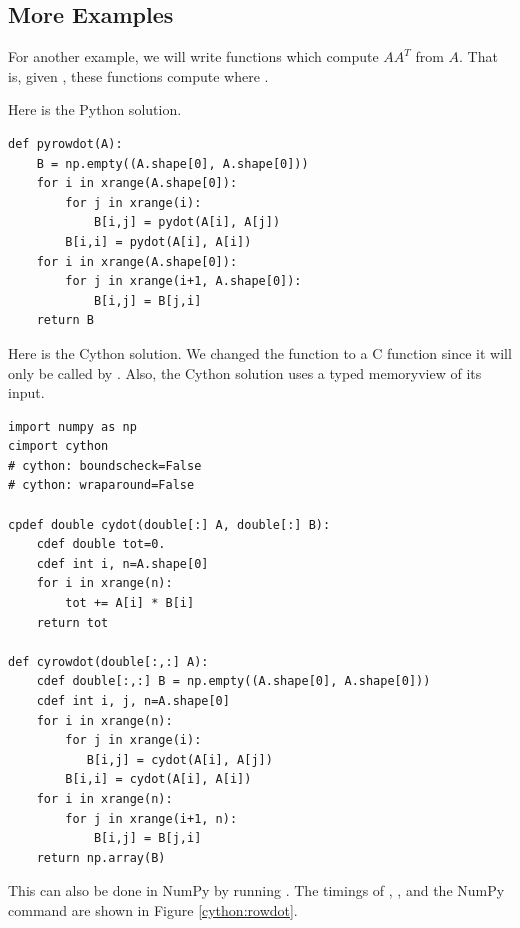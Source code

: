 \subsection*{More Examples}
For another example, we will write functions which compute $AA^T$ from $A$.
That is, given , these functions compute  where
.

Here is the Python solution.
\begin{lstlisting}
def pyrowdot(A):
    B = np.empty((A.shape[0], A.shape[0]))
    for i in xrange(A.shape[0]):
        for j in xrange(i):
            B[i,j] = pydot(A[i], A[j])
        B[i,i] = pydot(A[i], A[i])
    for i in xrange(A.shape[0]):
        for j in xrange(i+1, A.shape[0]):
            B[i,j] = B[j,i]
    return B
\end{lstlisting}

Here is the Cython solution. 
We changed the function  to a C function since it will only be called by .
Also, the Cython solution uses a typed memoryview of its input.

\begin{lstlisting}
import numpy as np
cimport cython
# cython: boundscheck=False
# cython: wraparound=False

cpdef double cydot(double[:] A, double[:] B):
    cdef double tot=0.
    cdef int i, n=A.shape[0]
    for i in xrange(n):
        tot += A[i] * B[i]
    return tot

def cyrowdot(double[:,:] A):
    cdef double[:,:] B = np.empty((A.shape[0], A.shape[0]))
    cdef int i, j, n=A.shape[0]
    for i in xrange(n):
        for j in xrange(i):
           B[i,j] = cydot(A[i], A[j])
        B[i,i] = cydot(A[i], A[i])
    for i in xrange(n):
        for j in xrange(i+1, n):
            B[i,j] = B[j,i]
    return np.array(B)
\end{lstlisting}

This can also be done in NumPy by running .
The timings of , , and the NumPy command  are shown in Figure \ref{cython:rowdot}.

